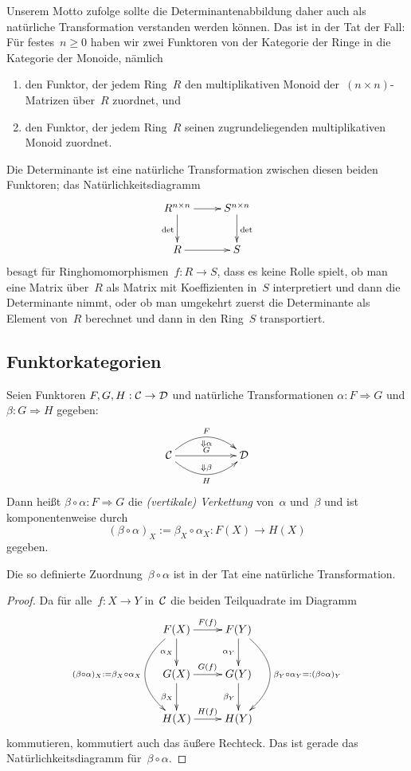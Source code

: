 Unserem Motto zufolge sollte die Determinantenabbildung daher
auch als natürliche Transformation verstanden werden können. Das ist in der Tat
der Fall: Für festes~$n \geq 0$ haben wir zwei Funktoren von der Kategorie der
Ringe in die Kategorie der Monoide, nämlich
\begin{enumerate}
\item den Funktor, der jedem Ring~$R$ den multiplikativen Monoid der~$(n \times
n)$-Matrizen über~$R$ zuordnet, und
\item den Funktor, der jedem Ring~$R$ seinen zugrundeliegenden multiplikativen
Monoid zuordnet.
\end{enumerate}
Die Determinante ist eine natürliche Transformation zwischen diesen beiden
Funktoren; das Natürlichkeitsdiagramm
\[ \xymatrix{
  R^{n \times n} \ar[r] \ar[d]_\det & S^{n \times n} \ar[d]^\det \\
  R \ar[r] & S
} \]
besagt für Ringhomomorphismen~$f : R \to S$, dass es keine Rolle spielt, ob man
eine Matrix über~$R$ als Matrix mit Koeffizienten in~$S$ interpretiert und dann
die Determinante nimmt, oder ob man umgekehrt zuerst die Determinante als
Element von~$R$ berechnet und dann in den Ring~$S$ transportiert.



\subsection{Funktorkategorien}

\begin{defn}
Seien Funktoren $F,G,H: \mathcal{C} \to \mathcal{D}$ und natürliche Transformationen $\alpha: F
\Rightarrow G$ und $\beta: G \Rightarrow H$ gegeben:
\[ \xymatrix{\C \ar@/^1.7em/[rr]^F_{\Downarrow \alpha} \ar[rr]^G \ar@/_1.7em/[rr]^{\Downarrow \beta}_H & & \D} \]
Dann heißt $\beta \circ \alpha:F \Rightarrow G$ die \emph{(vertikale)
Verkettung} von~$\alpha$ und~$\beta$ und ist komponentenweise durch
\[ (\beta \circ \alpha)_X := \beta_X \circ \alpha_X : F(X) \to H(X) \]
gegeben.
\end{defn}

\begin{prop}Die so definierte Zuordnung~$\beta \circ \alpha$ ist in der Tat
eine natürliche Transformation.\end{prop}
\begin{proof}Da für alle~$f:X \to Y$ in~$\mathcal{C}$ die beiden Teilquadrate
im Diagramm
\[ \xymatrix{
  F(X) \ar[r]^{F(f)} \ar[d]_{\alpha_X} \ar@/_ 1cm/[dd]_{(\beta \circ \alpha)_X := \beta_X \circ \alpha_X} & F(Y) \ar[d]_{\alpha_Y} \ar@/^ 1cm/[dd]^{\beta_Y \circ \alpha_Y =: (\beta \circ \alpha)_Y} \\
  G(X) \ar[r]^{G(f)} \ar[d]_{\beta_X} & G(Y) \ar[d]_{\beta_Y} \\
  H(X) \ar[r]^{H(f)} & H(Y)
} \]
kommutieren, kommutiert auch das äußere Rechteck. Das ist gerade das
Natür\-lich\-keits\-dia\-gramm für~$\beta\circ\alpha$.
\end{proof}


